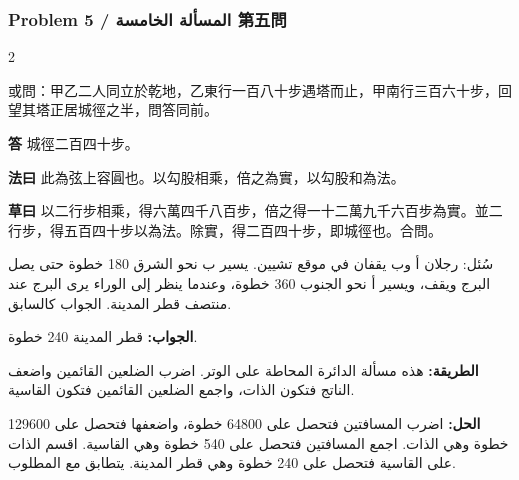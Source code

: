 \documentclass[11pt,a4paper]{article}
\newcommand{\ar}[1]{\arabicfont\beginR #1\endR}
\newcommand{\Answer}[1]{\par\noindent\textbf{\color{problemcolor}答} #1\par}
\newcommand{\Method}[1]{\par\noindent\textbf{\color{problemcolor}法曰} #1\par}
\newcommand{\Workings}[1]{\par\noindent\textbf{\color{problemcolor}草曰} #1\par}
\newcommand{\AnswerAr}{\par\noindent\textbf{\color{problemcolor}\ar{الجواب:}} }
\newcommand{\MethodAr}{\par\noindent\textbf{\color{problemcolor}\ar{الطريقة:}} }
\newcommand{\WorkingsAr}{\par\noindent\textbf{\color{problemcolor}\ar{الحل:}} }
\begin{document}
\vspace{0.5cm}

\subsubsection*{Problem 5 / \ar{المسألة الخامسة} \quad 第五問}

\begin{paracol}{2}

\noindent 或問：甲乙二人同立於乾地，乙東行一百八十步遇塔而止，甲南行三百六十步，回望其塔正居城徑之半，問答同前。

\vspace{0.2cm}

\Answer{城徑二百四十步。}

\vspace{0.2cm}

\Method{此為弦上容圓也。以勾股相乘，倍之為實，以勾股和為法。}

\vspace{0.2cm}

\Workings{以二行步相乘，得六萬四千八百步，倍之得一十二萬九千六百步為實。並二行步，得五百四十步以為法。除實，得二百四十步，即城徑也。合問。}

\switchcolumn

\ar{سُئل: رجلان أ وب يقفان في موقع تشيين. يسير ب نحو الشرق 180 خطوة حتى يصل البرج ويقف، ويسير أ نحو الجنوب 360 خطوة، وعندما ينظر إلى الوراء يرى البرج عند منتصف قطر المدينة. الجواب كالسابق.}

\vspace{0.2cm}

\AnswerAr{قطر المدينة 240 خطوة.}

\vspace{0.2cm}

\MethodAr{هذه مسألة الدائرة المحاطة على الوتر. اضرب الضلعين القائمين واضعف الناتج فتكون الذات، واجمع الضلعين القائمين فتكون القاسية.}

\vspace{0.2cm}

\WorkingsAr{اضرب المسافتين فتحصل على 64800 خطوة، واضعفها فتحصل على 129600 خطوة وهي الذات. اجمع المسافتين فتحصل على 540 خطوة وهي القاسية. اقسم الذات على القاسية فتحصل على 240 خطوة وهي قطر المدينة. يتطابق مع المطلوب.}

\end{paracol}

\vspace{0.5cm}
\end{document}
